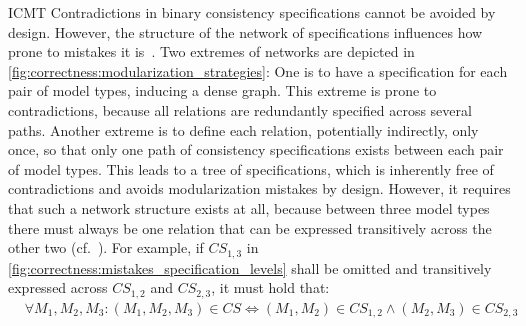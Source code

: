 \begin{copiedFrom}{ICMT}
Contradictions in binary consistency specifications cannot be avoided by design.
However, the structure of the network of specifications influences how prone to mistakes it is~\cite{klare2018docsym}.
Two extremes of networks are depicted in \autoref{fig:correctness:modularization_strategies}:
One is to have a specification for each pair of model types, inducing a dense graph. %
This extreme is prone to contradictions, because all relations are redundantly specified across several paths.
Another extreme is to define each relation, potentially indirectly, only once, so that only one path of consistency specifications exists between each pair of model types.
This leads to a tree of specifications, which is inherently free of contradictions and %
avoids modularization mistakes by design.
However, it requires that such a network structure exists at all, because between three model types there must always be one relation that can be expressed transitively across the other two (cf.~\cite{klare2018docsym}).
For example, if $\mathit{CS}_{1,3}$ in \autoref{fig:correctness:mistakes_specification_levels} shall be omitted and transitively expressed across $\mathit{CS}_{1,2}$ and $\mathit{CS}_{2,3}$, it must hold that:
\begin{align*}
    & \forall M_1, M_2, M_3 : (M_1, M_2, M_3) \in \mathit{CS} \Leftrightarrow (M_1, M_2) \in \mathit{CS}_{1,2} \land (M_2, M_3) \in \mathit{CS}_{2,3}
\end{align*}


\end{copiedFrom}
